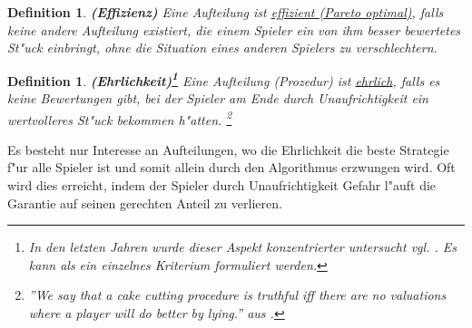 \documentclass[11pt, a4paper, twoside]{article}
\newtheorem{defi}[satz]{Definition}
\numberwithin{equation}{section}
\begin{document}
\begin{defi}{\textbf{(Effizienz)}}
\newline Eine Aufteilung ist \underline{effizient (Pareto optimal)}, falls keine andere Aufteilung existiert, die einem Spieler ein von ihm besser bewertetes St"uck einbringt, ohne die Situation eines anderen Spielers zu verschlechtern. 
\end{defi}
\begin{defi}{\textbf{(Ehrlichkeit)\footnote{In den letzten Jahren wurde dieser Aspekt konzentrierter untersucht vgl. \cite{23}. Es kann als ein einzelnes Kriterium formuliert werden.}}}
\newline Eine Aufteilung (Prozedur) ist \underline{ehrlich}, falls es keine Bewertungen gibt, bei der Spieler am Ende durch Unaufrichtigkeit ein wertvolleres St"uck bekommen h"atten. \footnote{''We say that a cake cutting procedure is truthful iff there are no valuations where a player will do better by lying.'' aus \cite{41}.}
\end{defi}
Es besteht nur Interesse an Aufteilungen, wo die Ehrlichkeit die beste Strategie f"ur alle Spieler ist und somit allein durch den Algorithmus erzwungen wird. Oft wird dies erreicht, indem der Spieler durch Unaufrichtigkeit Gefahr l"auft die Garantie auf seinen gerechten Anteil zu verlieren.\\
\end{document}
